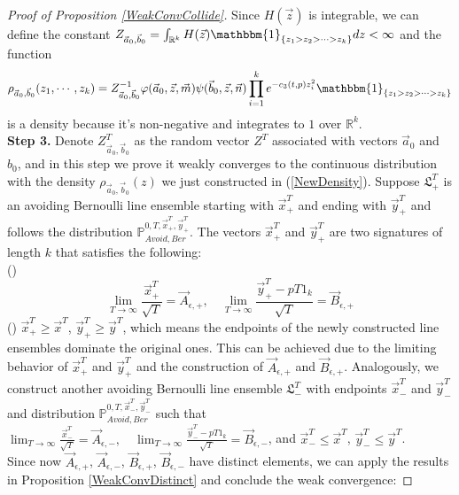 \begin{proof}[Proof of Proposition \ref{WeakConvCollide}]
Since $H(\vec{z})$ is integrable, we can define the constant $Z_{\vec{a}_{0},\vec{b}_{0}}=\int_{\mathbb{R}^{k}}H(\vec{z})\mathbbm{1}_{\{z_1>z_2>\cdots>z_{k}\}}dz<\infty$ and the function \begin{align}{\label{NewDensity}}
	\rho_{\vec{a}_{0},\vec{b}_{0}}(z_{1},\cdots,z_{k})=Z_{\vec{a}_{0},\vec{b}_{0}}^{-1}\varphi(\vec{a}_{0},\vec{z},\vec{m})\psi(\vec{b}_{0},\vec{z},\vec{n})\prod_{i=1}^{k}e^{-c_{3}(t,p)z_{i}^{2}}\mathbbm{1}_{\{z_1>z_2>\cdots>z_{k}\}}
\end{align}
is a density because it's non-negative and integrates to $1$ over $\mathbb{R}^{k}$.\\
\textbf{Step 3. }Denote $Z^{T}_{\vec{a}_{0},\vec{b}_{0}}$ as the random vector $Z^{T}$ associated with vectors $\vec{a}_{0}$ and $b_{0}$, and in this step we prove it weakly converges to the continuous distribution with the density $\rho_{\vec{a}_{0},\vec{b}_{0}}(z)$ we just constructed in (\ref{NewDensity}). Suppose $\mathfrak{L}_{+}^{T}$ is an avoiding Bernoulli line ensemble starting with $\vec{x}^{T}_{+}$ and ending with $\vec{y}^{T}_{+}$ and follows the distribution $\mathbb{P}_{Avoid,Ber}^{0,T,\vec{x}^{T}_{+},\vec{y}^{T}_{+}}$. The vectors $\vec{x}^{T}_{+}$ and $\vec{y}^{T}_{+}$ are two signatures of length $k$ that satisfies the following:\\
()$$\lim_{T\rightarrow\infty}\frac{\vec{x}^{T}_{+}}{\sqrt{T}}=\vec{A}_{\epsilon,+},\quad \lim_{T\rightarrow\infty}\frac{\vec{y}^{T}_{+}-pT1_{k}}{\sqrt{T}}=\vec{B}_{\epsilon,+}$$
() $\vec{x}^{T}_{+}\geqslant \vec{x}^{T}$, $\vec{y}^{T}_{+}\geqslant \vec{y}^{T}$, which means the endpoints of the newly constructed line ensembles dominate the original ones. This can be achieved due to the limiting behavior of $\vec{x}^{T}_{+}$ and $\vec{y}^{T}_{+}$ and the construction of $\vec{A}_{\epsilon,+}$ and $\vec{B}_{\epsilon,+}$.
Analogously, we construct another avoiding Bernoulli line ensemble $\mathfrak{L}_{-}^{T}$ with endpoints $\vec{x}^{T}_{-}$ and $\vec{y}^{T}_{-}$ and distribution $\mathbb{P}_{Avoid,Ber}^{0,T,\vec{x}^{T}_{-},\vec{y}^{T}_{-}}$ such that $\lim_{T\rightarrow\infty}\frac{\vec{x}^{T}_{-}}{\sqrt{T}}=\vec{A}_{\epsilon,-},\quad \lim_{T\rightarrow\infty}\frac{\vec{y}^{T}_{-}-pT1_{k}}{\sqrt{T}}=\vec{B}_{\epsilon,-}$, and $\vec{x}^{T}_{-}\leqslant \vec{x}^{T}$, $\vec{y}^{T}_{-}\leqslant \vec{y}^{T}$.\\
Since now $\vec{A}_{\epsilon,+}$, $\vec{A}_{\epsilon,-}$, $\vec{B}_{\epsilon, +}$, $\vec{B}_{\epsilon,-}$ have distinct elements, we can apply the results in Proposition \ref{WeakConvDistinct} and conclude the weak convergence:

\end{proof}
